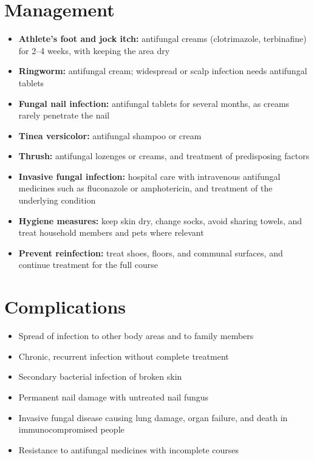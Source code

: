 \section*{Management}
\begin{itemize}
    \item \textbf{Athlete's foot and jock itch:} antifungal creams (clotrimazole, terbinafine) for 2--4 weeks, with keeping the area dry
    \item \textbf{Ringworm:} antifungal cream; widespread or scalp infection needs antifungal tablets
    \item \textbf{Fungal nail infection:} antifungal tablets for several months, as creams rarely penetrate the nail
    \item \textbf{Tinea versicolor:} antifungal shampoo or cream
    \item \textbf{Thrush:} antifungal lozenges or creams, and treatment of predisposing factors
    \item \textbf{Invasive fungal infection:} hospital care with intravenous antifungal medicines such as fluconazole or amphotericin, and treatment of the underlying condition
    \item \textbf{Hygiene measures:} keep skin dry, change socks, avoid sharing towels, and treat household members and pets where relevant
    \item \textbf{Prevent reinfection:} treat shoes, floors, and communal surfaces, and continue treatment for the full course
\end{itemize}

\section*{Complications}
\begin{itemize}
    \item Spread of infection to other body areas and to family members
    \item Chronic, recurrent infection without complete treatment
    \item Secondary bacterial infection of broken skin
    \item Permanent nail damage with untreated nail fungus
    \item Invasive fungal disease causing lung damage, organ failure, and death in immunocompromised people
    \item Resistance to antifungal medicines with incomplete courses
\end{itemize}

